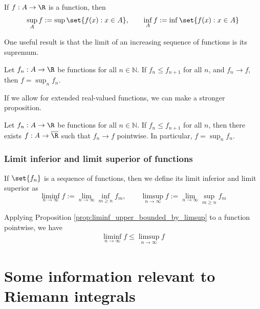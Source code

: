\documentclass{article} %
\begin{document}
\begin{definition}
If $f : A \to \R$ is a function, then 
\[ \sup_A f := \sup \set{f(x) : x \in A}, \quad \quad \inf_A f := \inf \set{f(x) : x \in A} \]	
\end{definition}

One useful result is that the limit of an increasing sequence of functions is its supremum.

\begin{proposition}
Let $f_n : A \to \R$ be functions for all $n \in \mathbb{N}$. If $f_n \leq f_{n+1}$ for all $n$, and $f_n \to f$, then $f = \sup_n f_n$.
\label{prop:limit_of_an_increasing_sequence_of_functions_is_its_supremum}	
\end{proposition}

If we allow for extended real-valued functions, we can make a stronger proposition.
\begin{proposition}
Let $f_n : A \to \R$ be functions for all $n \in \mathbb{N}$. If $f_n \leq f_{n+1}$ for all $n$, then there exists $f: A \to \overline{\R}$ such that  $f_n \to f$ pointwise. In particular, $f=\sup_n f_n$.
\label{prop:limit_of_an_increasing_sequence_of_functions_exists_and_is_the_supremum_if_we_allow_functions_to_map_to_the_extended_reals}	
\end{proposition}



\subsubsection{Limit inferior and limit superior of functions}

\begin{definition}
If $\set{f_n}$ is a sequence of functions, then  we define its limit inferior and limit superior as 
\[ \liminf_{n \to \infty} f := \lim_{n \to \infty} \inf_{m \geq n} f_m, \quad \quad \limsup_{n \to \infty} f := \lim_{n \to \infty} \sup_{m \geq n} f_m \]	
\end{definition}


Applying Proposition \ref{prop:liminf_upper_bounded_by_limsup} to a function pointwise, we have 
\begin{align}
\liminf_{n \to \infty} f  \leq \limsup_{n \to \infty} f  
\label{eqn:liminf_upper_bounded_by_limsup_for_functions}
\end{align}



\section{Some information relevant to Riemann integrals} \label{sec:some_info_relevant_to_Riemann_integrals}
\end{document}
